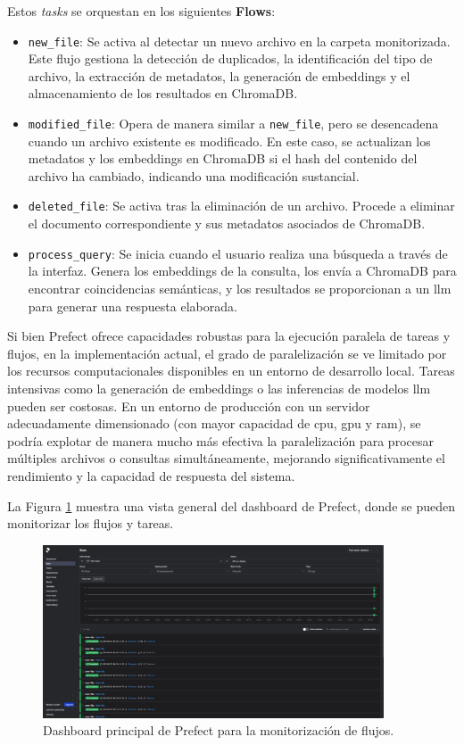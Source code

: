 Estos \textit{tasks} se orquestan en los siguientes \textbf{Flows}:
\begin{itemize}
    \item \texttt{new\_file}: Se activa al detectar un nuevo archivo en la carpeta monitorizada. Este flujo gestiona la detección de duplicados, la identificación del tipo de archivo, la extracción de metadatos, la generación de embeddings y el almacenamiento de los resultados en ChromaDB.
    \item \texttt{modified\_file}: Opera de manera similar a \texttt{new\_file}, pero se desencadena cuando un archivo existente es modificado. En este caso, se actualizan los metadatos y los embeddings en ChromaDB si el hash del contenido del archivo ha cambiado, indicando una modificación sustancial.
    \item \texttt{deleted\_file}: Se activa tras la eliminación de un archivo. Procede a eliminar el documento correspondiente y sus metadatos asociados de ChromaDB.
    \item \texttt{process\_query}: Se inicia cuando el usuario realiza una búsqueda a través de la interfaz. Genera los embeddings de la consulta, los envía a ChromaDB para encontrar coincidencias semánticas, y los resultados se proporcionan a un \gls{llm} para generar una respuesta elaborada.
\end{itemize}

Si bien Prefect ofrece capacidades robustas para la ejecución paralela de tareas y flujos, en la implementación actual, el grado de paralelización se ve limitado por los recursos computacionales disponibles en un entorno de desarrollo local. Tareas intensivas como la generación de embeddings o las inferencias de modelos \gls{llm} pueden ser costosas. En un entorno de producción con un servidor adecuadamente dimensionado (con mayor capacidad de \gls{cpu}, \gls{gpu} y \gls{ram}), se podría explotar de manera mucho más efectiva la paralelización para procesar múltiples archivos o consultas simultáneamente, mejorando significativamente el rendimiento y la capacidad de respuesta del sistema.

La Figura \ref{fig:prefect_dashboard} muestra una vista general del dashboard de Prefect, donde se pueden monitorizar los flujos y tareas.

\begin{figure}[!htbp]
    \centering
    \includegraphics[width=0.9\textwidth]{archivos/prefect.png}
    \caption{Dashboard principal de Prefect para la monitorización de flujos.}
    \label{fig:prefect_dashboard}
\end{figure}

